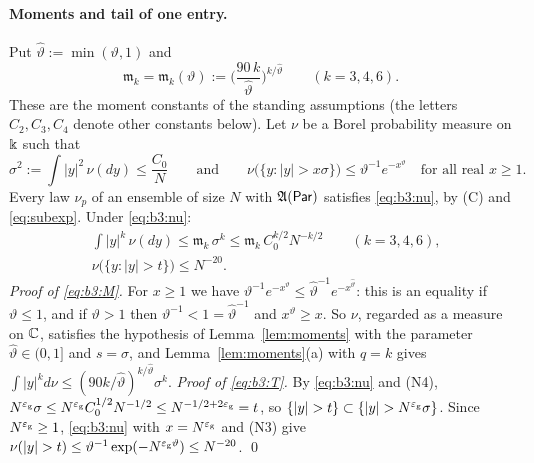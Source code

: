 \paragraph{Moments and tail of one entry.} Put $\hat\vartheta:=\min(\vartheta,1)$ and
\[
\mathfrak m_k=\mathfrak m_k(\vartheta):=\Big(\frac{90\,k}{\hat\vartheta}\Big)^{k/\hat\vartheta}\qquad(k=3,4,6).
\]
These are the moment constants of the standing assumptions (the letters $C_2,C_3,C_4$ denote other constants below).
Let $\nu$ be a Borel probability measure on $\Bbbk$ such that
\begin{equation}\label{eq:b3:nu}
\sigma^2:=\int|y|^2\,\nu(dy)\le\frac{C_0}N\qquad\text{and}\qquad\nu\big(\{y:|y|>x\sigma\}\big)\le\vartheta^{-1}e^{-x^\vartheta}\quad\text{for all real }x\ge1 .
\end{equation}
Every law $\nu_p$ of an ensemble of size $N$ with $\mathfrak{A}(\mathsf{Par})$ satisfies \eqref{eq:b3:nu}, by (C) and \eqref{eq:subexp}. Under \eqref{eq:b3:nu}:
\begin{align}
&\int|y|^k\,\nu(dy)\le\mathfrak m_k\,\sigma^k\le\mathfrak m_k\,C_0^{k/2}N^{-k/2}\qquad(k=3,4,6),\label{eq:b3:M}\\
&\nu\big(\{y:|y|>t\}\big)\le N^{-20}.\label{eq:b3:T}
\end{align}
\emph{Proof of \eqref{eq:b3:M}.} For $x\ge1$ we have $\vartheta^{-1}e^{-x^\vartheta}\le\hat\vartheta^{-1}e^{-x^{\hat\vartheta}}$: this is an equality if $\vartheta\le1$, and if $\vartheta>1$ then
$\vartheta^{-1}<1=\hat\vartheta^{-1}$ and $x^\vartheta\ge x$. So $\nu$, regarded as a measure on $\mathbb{C}$, satisfies the hypothesis of Lemma~\ref{lem:moments} with the parameter
$\hat\vartheta\in(0,1]$ and $s=\sigma$, and Lemma~\ref{lem:moments}(a) with $q=k$ gives $\int|y|^k d\nu\le(90k/\hat\vartheta)^{k/\hat\vartheta}\sigma^k$.
\emph{Proof of \eqref{eq:b3:T}.} By \eqref{eq:b3:nu} and \textup{(N4)}, $N^{\varepsilon_{\mathrm g}}\sigma\le N^{\varepsilon_{\mathrm g}}C_0^{1/2}N^{-1/2}\le N^{-1/2+2\varepsilon_{\mathrm g}}=t$, so
$\{|y|>t\}\subset\{|y|>N^{\eg}\sigma\}$. Since $N^{\varepsilon_{\mathrm g}}\ge1$, \eqref{eq:b3:nu} with $x=N^{\varepsilon_{\mathrm g}}$ and \textup{(N3)} give
$\nu(|y|>t)\le\vartheta^{-1}\exp(-N^{\eg\vartheta})\le N^{-20}$. \qed

